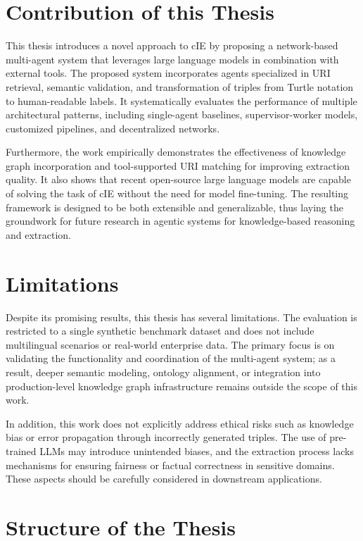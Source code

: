 \documentclass[a4paper,oneside,bibliography=totoc]{scrbook}
\begin{document}
\section{Contribution of this Thesis}
\label{sec:contribution}

This thesis introduces a novel approach to \ac{cIE} by proposing a network-based multi-agent system that leverages large language models in combination with external tools. The proposed system incorporates agents specialized in URI retrieval, semantic validation, and transformation of triples from Turtle notation to human-readable labels. It systematically evaluates the performance of multiple architectural patterns, including single-agent baselines, supervisor-worker models, customized pipelines, and decentralized networks.

Furthermore, the work empirically demonstrates the effectiveness of knowledge graph incorporation and tool-supported URI matching for improving extraction quality. It also shows that recent open-source large language models are capable of solving the task of \ac{cIE} without the need for model fine-tuning. The resulting framework is designed to be both extensible and generalizable, thus laying the groundwork for future research in agentic systems for knowledge-based reasoning and extraction.

\section{Limitations}
\label{sec:limitations}

Despite its promising results, this thesis has several limitations. The evaluation is restricted to a single synthetic benchmark dataset and does not include multilingual scenarios or real-world enterprise data. The primary focus is on validating the functionality and coordination of the multi-agent system; as a result, deeper semantic modeling, ontology alignment, or integration into production-level knowledge graph infrastructure remains outside the scope of this work.

In addition, this work does not explicitly address ethical risks such as knowledge bias or error propagation through incorrectly generated triples. The use of pre-trained \acp{LLM} may introduce unintended biases, and the extraction process lacks mechanisms for ensuring fairness or factual correctness in sensitive domains. These aspects should be carefully considered in downstream applications.

\section{Structure of the Thesis}
\label{sec:structure}
\end{document}
